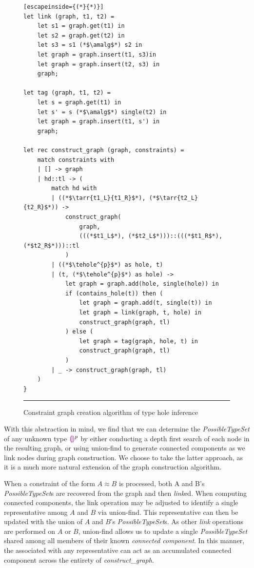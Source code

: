 \begin{figure}[htbp]
\begin{lstlisting}[escapeinside={(*}{*)}]
let link (graph, t1, t2) =
    let s1 = graph.get(t1) in
    let s2 = graph.get(t2) in
    let s3 = s1 (*$\amalg$*) s2 in
    let graph = graph.insert(t1, s3)in
    let graph = graph.insert(t2, s3) in
    graph;

let tag (graph, t1, t2) =
    let s = graph.get(t1) in
    let s' = s (*$\amalg$*) single(t2) in
    let graph = graph.insert(t1, s') in 
    graph;

let rec construct_graph (graph, constraints) =
    match constraints with
    | [] -> graph
    | hd::tl -> (
        match hd with
        | ((*$\tarr{t1_L}{t1_R}$*), (*$\tarr{t2_L}{t2_R}$*)) ->
            construct_graph(
                graph, 
                (((*$t1_L$*), (*$t2_L$*)))::(((*$t1_R$*), (*$t2_R$*)))::tl
            )
        | ((*$\tehole^{p}$*) as hole, t)
        | (t, (*$\tehole^{p}$*) as hole) ->
            let graph = graph.add(hole, single(hole)) in
            if (contains_hole(t)) then (
                let graph = graph.add(t, single(t)) in
                let graph = link(graph, t, hole) in
                construct_graph(graph, tl)
            ) else (
                let graph = tag(graph, hole, t) in
                construct_graph(graph, tl)
            )
        | _ -> construct_graph(graph, tl)
    )
}

\end{lstlisting}
\vspace{-4px}
 \hrule
\caption{Constraint graph creation algorithm of type hole inference}
\label{fig:algcode}
\end{figure}

With this abstraction in mind, we find that we can determine the \textit{PossibleTypeSet} of any unknown type $\textcolor{violet}{\llparenthesis}\textcolor{violet}{\rrparenthesis}^{p}$ by either conducting a depth first search of each node in the resulting graph, or using union-find to generate connected components as we link nodes during graph construction. We choose to take the latter approach, as it is a much more natural extension of the graph construction algorithm.

When a constraint of the form $A \approx B$ is processed, both A and B's \textit{PossibleTypeSet}s are recovered from the graph and then \textit{link}ed. When computing connected components, the link operation may be adjusted to identify a single representative among $A$ and $B$ via union-find. This representative can then be updated with the union of $A$ and $B$'s \textit{PossibleTypeSet}s. As other \textit{link} operations are performed on $A$ or $B$, union-find allows us to update a single \textit{PossibleTypeSet} shared among all members of their known \textit{connected component}. In this manner, the  associated with any representative can act as an accumulated connected component across the entirety of \textit{construct\_graph}.

